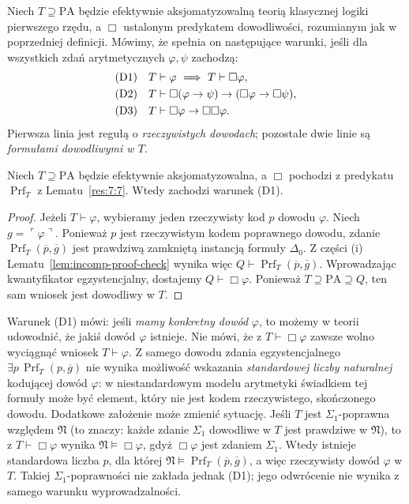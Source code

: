 \begin{definicja}\label{def:hilbert-bernays-loeb}
Niech $T\supseteq\mathrm{PA}$ będzie efektywnie
aksjomatyzowalną teorią klasycznej logiki pierwszego rzędu,
a $\Box$ ustalonym predykatem dowodliwości,
rozumianym jak w poprzedniej definicji.
Mówimy, że spełnia on następujące warunki, jeśli dla
wszystkich zdań arytmetycznych $\varphi,\psi$ zachodzą:
\begin{align*}
\textup{(D1)}\quad&T\vdash\varphi\ \Longrightarrow\ T\vdash\Box\varphi,\\
\textup{(D2)}\quad&T\vdash\Box(\varphi\to\psi)\to(\Box\varphi\to\Box\psi),\\
\textup{(D3)}\quad&T\vdash\Box\varphi\to\Box\Box\varphi.
\end{align*}
Pierwsza linia jest regułą o \emph{rzeczywistych dowodach};
pozostałe dwie linie są \emph{formułami dowodliwymi w $T$}.
\end{definicja}

\begin{lemat}\label{lem:d1-provability}
Niech $T\supseteq\mathrm{PA}$ będzie efektywnie
aksjomatyzowalna, a $\Box$ pochodzi z predykatu
$\operatorname{Prf}_T$ z Lematu~\ref{res:7:7}.
Wtedy zachodzi warunek \textup{(D1)}.
\end{lemat}
\begin{proof}
Jeżeli $T\vdash\varphi$, wybieramy jeden
rzeczywisty kod $p$ dowodu $\varphi$.
Niech $g=\ulcorner\varphi\urcorner$.
Ponieważ $p$ jest rzeczywistym kodem poprawnego dowodu,
zdanie $\operatorname{Prf}_T(\overline p,\overline g)$
jest prawdziwą zamkniętą instancją formuły $\Delta_0$.
Z części (i) Lematu~\ref{lem:incomp-proof-check}
wynika więc $Q\vdash\operatorname{Prf}_T(\overline p,\overline g)$.
Wprowadzając kwantyfikator egzystencjalny,
dostajemy $Q\vdash\Box\varphi$.
Ponieważ $T\supseteq\mathrm{PA}\supseteq Q$,
ten sam wniosek jest dowodliwy w $T$.
\end{proof}

\begin{przyklad}
Warunek (D1) mówi: jeśli \emph{mamy konkretny dowód}
$\varphi$, to możemy w teorii udowodnić,
że jakiś dowód $\varphi$ istnieje. Nie mówi,
że z $T\vdash\Box\varphi$ zawsze wolno wyciągnąć
wniosek $T\vdash\varphi$.
Z samego dowodu zdania egzystencjalnego
$\exists p\,\operatorname{Prf}_T(p,\overline g)$
nie wynika możliwość wskazania \emph{standardowej liczby
naturalnej} kodującej dowód $\varphi$: w niestandardowym
modelu arytmetyki świadkiem tej formuły może być element,
który nie jest kodem rzeczywistego, skończonego dowodu.
Dodatkowe założenie może zmienić sytuację. Jeśli $T$ jest
$\Sigma_1$-poprawna względem $\mathfrak N$ (to znaczy:
każde zdanie $\Sigma_1$ dowodliwe w $T$ jest prawdziwe
w $\mathfrak N$), to z
$T\vdash\Box\varphi$ wynika
$\mathfrak N\models\Box\varphi$, gdyż
$\Box\varphi$ jest zdaniem $\Sigma_1$.
Wtedy istnieje standardowa liczba $p$, dla której
$\mathfrak N\models\operatorname{Prf}_T(\overline p,\overline g)$,
a więc rzeczywisty dowód $\varphi$ w $T$.
Takiej $\Sigma_1$-poprawności nie zakłada jednak (D1);
jego odwrócenie nie wynika z samego warunku wyprowadzalności.
\end{przyklad}

